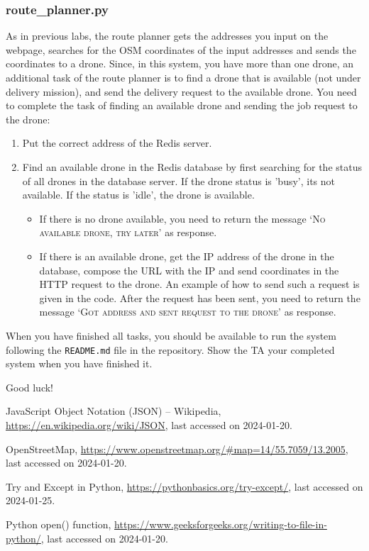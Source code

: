 \documentclass{article}
\begin{document}
\subsubsection{route\_planner.py}
As in previous labs, the route planner gets the addresses you input on the webpage, searches for the OSM coordinates of the input addresses and sends the coordinates to a drone. Since, in this system, you have more than one drone, an additional task of the route planner is to find a drone that is available (not under delivery mission), and send the delivery request to the available drone. You need to complete the task of finding an available drone and sending the job request to the drone:
\begin{enumerate}
    \item Put the correct address of the Redis server.
    \item Find an available drone in the Redis database by first searching for the status of all drones in the database server. If the drone status is 'busy', its not available. If the status is 'idle', the drone is available.
    \begin{itemize}
        \item If there is no drone available, you need to return the message {\textsc{`No available drone, try later'}} as response.
        \item If there is an available drone, get the IP address of the drone in the database, compose the URL with the IP and send coordinates in the HTTP request to the drone. An example of how to send such a request is given in the code. After the request has been sent, you need to return the message {\textsc{`Got address and sent request to the drone'}} as response.
    \end{itemize}
\end{enumerate}

When you have finished all tasks, you should be available to run the system following the \texttt{README.md} file in the repository. Show the TA your completed system when you have finished it.

\vspace{1cm}
\begin{center}
\huge Good luck!
\end{center}

\begin{thebibliography}{10} 

 JavaScript Object Notation (JSON) -- Wikipedia, \url{https://en.wikipedia.org/wiki/JSON}, last accessed on 2024-01-20.

 OpenStreetMap, \url{https://www.openstreetmap.org/#map=14/55.7059/13.2005}, last accessed on 2024-01-20.

 Try and Except in Python, \url{https://pythonbasics.org/try-except/}, last accessed on 2024-01-25.

 Python open() function, \url{https://www.geeksforgeeks.org/writing-to-file-in-python/}, last accessed on 2024-01-20.

\end{thebibliography}
\end{document}
